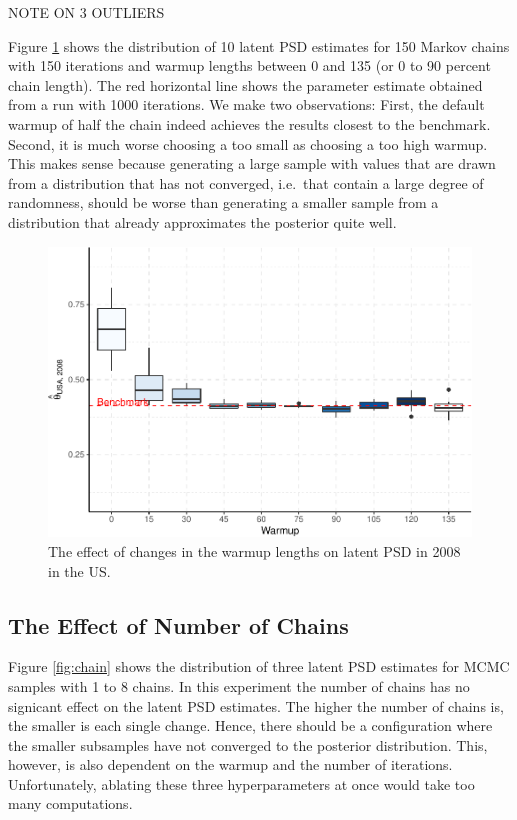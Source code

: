 \documentclass[12pt,english,a4paper,oneside]{article}
\theoremstyle{definition}
\theoremstyle{definition}
\theoremstyle{definition}
\theoremstyle{definition}
\theoremstyle{remark}
\begin{document}
NOTE ON 3 OUTLIERS

Figure \ref{fig:warmup} shows the distribution of 10 latent PSD estimates for 150 Markov chains with 150 iterations and warmup lengths between 0 and 135 (or 0 to 90 percent chain length). The red horizontal line shows the parameter estimate obtained from a run with 1000 iterations. We make two observations: First, the default warmup of half the chain indeed achieves the results closest to the benchmark. Second, it is much worse choosing a too small as choosing a too high warmup. This makes sense because generating a large sample with values that are drawn from a distribution that has not converged, i.e.~that contain a large degree of randomness, should be worse than generating a smaller sample from a distribution that already approximates the posterior quite well.

\begin{figure}[H]
\includegraphics[width=\textwidth]{figs/warmup-1} \caption[The effect of changes in the warmup lengths on latent PSD in 2008 in the US]{The effect of changes in the warmup lengths on latent PSD in 2008 in the US.}\label{fig:warmup}
\end{figure}

\hypertarget{the-effect-of-number-of-chains}{%
\subsection{The Effect of Number of Chains}\label{the-effect-of-number-of-chains}}

Figure \ref{fig:chain} shows the distribution of three latent PSD estimates for MCMC samples with 1 to 8 chains. In this experiment the number of chains has no signicant effect on the latent PSD estimates. The higher the number of chains is, the smaller is each single change. Hence, there should be a configuration where the smaller subsamples have not converged to the posterior distribution. This, however, is also dependent on the warmup and the number of iterations. Unfortunately, ablating these three hyperparameters at once would take too many computations.
\end{document}
